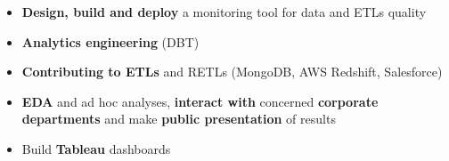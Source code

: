 \documentclass[a4paper,10pt]{article}
\begin{document}
\begin{adjustbox}{valign=t}
\begin{minipage}{0.6\textwidth}
\begin{description}
\begin{itemize}[topsep=0pt]
                    \item \textbf{Design, build and deploy} a monitoring tool for data and ETLs quality
                    \item \textbf{Analytics engineering} (DBT)
                    \item \textbf{Contributing to ETLs} and RETLs (MongoDB, AWS Redshift, Salesforce)
                    \item \textbf{EDA} and ad hoc analyses, \textbf{interact with} concerned \textbf{corporate departments} and make \textbf{public presentation} of results
                    \item Build \textbf{Tableau} dashboards
                \end{itemize}
                \normalsize
        \end{description}
        \vspace{-1cm}

\end{minipage}
\end{adjustbox}
\end{document}
